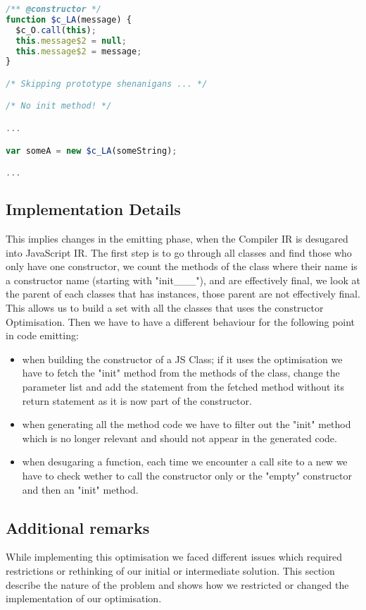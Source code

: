 \begin{lstlisting}[language=javascript,caption=Generated JavaScript with
constructor optimisation., label={lst:ctorOptJS}]
/** @constructor */
function $c_LA(message) {
  $c_O.call(this);
  this.message$2 = null;
  this.message$2 = message;
}

/* Skipping prototype shenanigans ... */

/* No init method! */

...

var someA = new $c_LA(someString);

...

\end{lstlisting}

\subsection{Implementation Details}
This implies changes in the emitting phase, when the Compiler IR is desugared
into JavaScript IR. The first step is to go through all classes and find those
who only have one constructor, we count the methods of the class where their
name is a constructor name (starting with "init\_\_\_"), and are effectively
final, we look at the parent of each classes that has instances, those parent
are not effectively final. This allows us to build a set with all the classes
that uses the constructor Optimisation. Then we have to have a different
behaviour for the following point in code emitting:
\begin{itemize}
\item when building the constructor of a JS Class; if it uses the optimisation
we have to fetch the "init" method from the methods of the class, change the
parameter list and add the statement from the fetched method without its return
statement as it is now part of the constructor.
\item when generating all the method code we have to filter out the "init"
method which is no longer relevant and should not appear in the generated code.
\item when desugaring a function, each time we encounter a call site to a new
we have to check wether to call the constructor only or the "empty" constructor
and then an "init" method.
\end{itemize}

\subsection{Additional remarks}
While implementing this optimisation we faced different issues which required
restrictions or rethinking of our initial or intermediate solution. This
section describe the nature of the problem and shows how we restricted or
changed the implementation of our optimisation.

